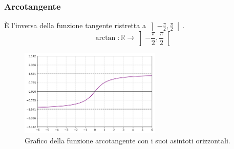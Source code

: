 \documentclass[oneside,10pt]{book} %
\begin{document}
\subsubsection{Arcotangente}
È l'inversa della funzione tangente ristretta a \(\left]-\frac{\pi}{2}, \frac{\pi}{2}\right[\).
\[ \arctan: \mathbb{R} \rightarrow \left]-\frac{\pi}{2}, \frac{\pi}{2}\right[ \]

\begin{figure}[H]
    \centering
    \includegraphics[width=0.6\textwidth]{./img/arcotangente.png}
    \caption{Grafico della funzione arcotangente con i suoi asintoti orizzontali.}
    \label{fig:arcotangente}
\end{figure}
\FloatBarrier

  
\end{document}

